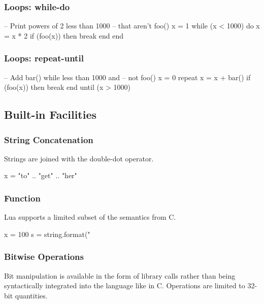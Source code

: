 \subsubsection{Loops: while-do}

\begin{LuaCode}
-- Print powers of 2 less than 1000
-- that aren't foo()
x = 1
while (x < 1000) do
	x = x * 2
	if (foo(x)) then
		break
	end
end
\end{LuaCode}

\subsubsection{Loops: repeat-until}

\begin{LuaCode}
-- Add bar() while less than 1000 and
-- not foo()
x = 0
repeat
	x = x + bar()
	if (foo(x)) then
		break
	end
until (x > 1000)
\end{LuaCode}

\subsection{Built-in Facilities}

\subsubsection{String Concatenation}

Strings are joined with the double-dot operator.

\begin{LuaCode}
x = "to" .. "get" .. "her"
\end{LuaCode}

\subsubsection{ Function}

Lua supports a limited subset of the  semantics from C.

\begin{LuaCode}
x = 100
s = string.format("%
\end{LuaCode}

\subsubsection{Bitwise Operations}

Bit manipulation is available in the form of library calls rather than being
syntactically  integrated into the language like in C.  Operations are limited
to 32-bit quantities.

